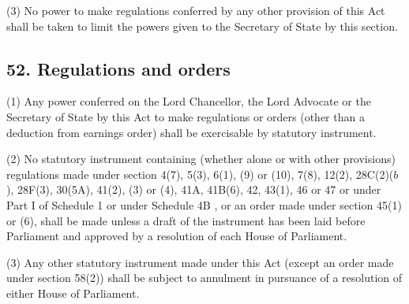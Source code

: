 \documentclass[12pt,a4paper]{article}
\begin{document}
(3) No power to make regulations conferred by any other provision of this Act shall be taken to limit the powers given to the Secretary of State by this section.


\subsection{52. Regulations and orders}

(1) Any power conferred on the Lord Chancellor, the Lord Advocate or the Secretary of State by this Act to make regulations or orders (other than a deduction from earnings order) shall be exercisable by statutory instrument.

(2) No statutory instrument containing (whether alone or with other provisions) regulations made under section 4(7), 5(3), 6(1), (9)  or (10), 7(8), 12(2), 
28C(2)($b$), 28F(3), 30(5A),  %
41(2), (3)  or (4), 
41A, 41B(6),  %
42, 43(1), 46 or 47 or under Part I of Schedule 1
or under Schedule 4B%
, or an order made under section 45(1)  or (6), shall be made unless a draft of the instrument has been laid before Parliament and approved by a resolution of each House of Parliament.

(3) Any other statutory instrument made under this Act (except an order made under section 58(2)) shall be subject to annulment in pursuance of a resolution of either House of Parliament.
\end{document}
